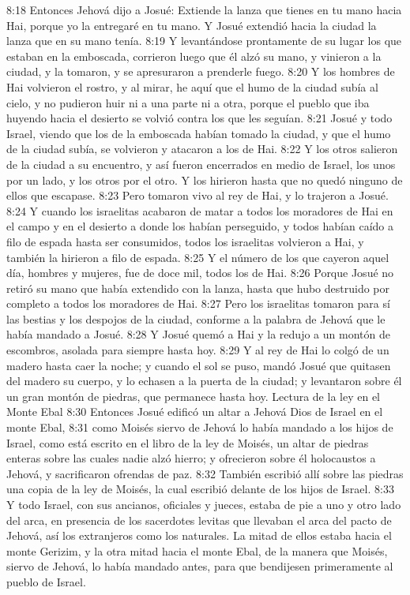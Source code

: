 8:18 Entonces Jehová dijo a Josué: Extiende la lanza que tienes en tu mano hacia Hai, porque yo la entregaré en tu mano. Y Josué extendió hacia la ciudad la lanza que en su mano tenía.  
8:19 Y levantándose prontamente de su lugar los que estaban en la emboscada, corrieron luego que él alzó su mano, y vinieron a la ciudad, y la tomaron, y se apresuraron a prenderle fuego.  
8:20 Y los hombres de Hai volvieron el rostro, y al mirar, he aquí que el humo de la ciudad subía al cielo, y no pudieron huir ni a una parte ni a otra, porque el pueblo que iba huyendo hacia el desierto se volvió contra los que les seguían.  
8:21 Josué y todo Israel, viendo que los de la emboscada habían tomado la ciudad, y que el humo de la ciudad subía, se volvieron y atacaron a los de Hai.  
8:22 Y los otros salieron de la ciudad a su encuentro, y así fueron encerrados en medio de Israel, los unos por un lado, y los otros por el otro. Y los hirieron hasta que no quedó ninguno de ellos que escapase.  
8:23 Pero tomaron vivo al rey de Hai, y lo trajeron a Josué.  
8:24 Y cuando los israelitas acabaron de matar a todos los moradores de Hai en el campo y en el desierto a donde los habían perseguido, y todos habían caído a filo de espada hasta ser consumidos, todos los israelitas volvieron a Hai, y también la hirieron a filo de espada.  
8:25 Y el número de los que cayeron aquel día, hombres y mujeres, fue de doce mil, todos los de Hai.  
8:26 Porque Josué no retiró su mano que había extendido con la lanza, hasta que hubo destruido por completo a todos los moradores de Hai.  
8:27 Pero los israelitas tomaron para sí las bestias y los despojos de la ciudad, conforme a la palabra de Jehová que le había mandado a Josué.  
8:28 Y Josué quemó a Hai y la redujo a un montón de escombros, asolada para siempre hasta hoy.  
8:29 Y al rey de Hai lo colgó de un madero hasta caer la noche; y cuando el sol se puso, mandó Josué que quitasen del madero su cuerpo, y lo echasen a la puerta de la ciudad; y levantaron sobre él un gran montón de piedras, que permanece hasta hoy.  
Lectura de la ley en el Monte Ebal  
8:30 Entonces Josué edificó un altar a Jehová Dios de Israel en el monte Ebal,  
8:31 como Moisés siervo de Jehová lo había mandado a los hijos de Israel, como está escrito en el libro de la ley de Moisés, un altar de piedras enteras sobre las cuales nadie alzó hierro; y ofrecieron sobre él holocaustos a Jehová, y sacrificaron ofrendas de paz.  
8:32 También escribió allí sobre las piedras una copia de la ley de Moisés, la cual escribió delante de los hijos de Israel. 
8:33 Y todo Israel, con sus ancianos, oficiales y jueces, estaba de pie a uno y otro lado del arca, en presencia de los sacerdotes levitas que llevaban el arca del pacto de Jehová, así los extranjeros como los naturales. La mitad de ellos estaba hacia el monte Gerizim, y la otra mitad hacia el monte Ebal, de la manera que Moisés, siervo de Jehová, lo había mandado antes, para que bendijesen primeramente al pueblo de Israel.  
